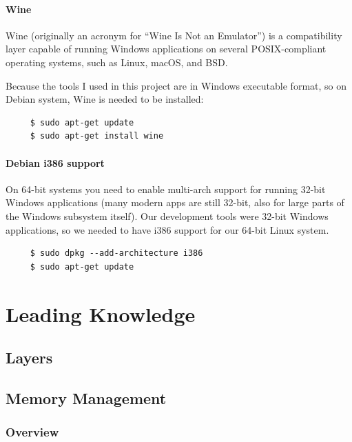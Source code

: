 \documentclass{swfcthesis}
\begin{document}
\subsubsection{Wine}

Wine (originally an acronym for ``Wine Is Not an Emulator'') is a compatibility layer
capable of running Windows applications on several POSIX-compliant operating systems, such
as Linux, macOS, and BSD\cite{wiki:wine}.

Because the tools I used in this project are in Windows executable format, so on Debian system,
Wine is needed to be installed:
\begin{verbatim}
     $ sudo apt-get update
     $ sudo apt-get install wine
\end{verbatim}

\subsubsection{Debian i386 support}

On 64-bit systems you need to enable multi-arch support for running 32-bit Windows
applications (many modern apps are still 32-bit, also for large parts of the Windows
subsystem itself). Our development tools were 32-bit Windows applications, so we needed to
have i386 support for our 64-bit Linux system.

\begin{verbatim}
     $ sudo dpkg --add-architecture i386
     $ sudo apt-get update
\end{verbatim}

\chapter{Leading Knowledge}
\label{cha:leading-knowledge-1}

\section{Layers}
\label{sec:layers}

\section{Memory Management}
\label{sec:memory-management}

\subsection{Overview}
\label{sec:overview}
\end{document}
